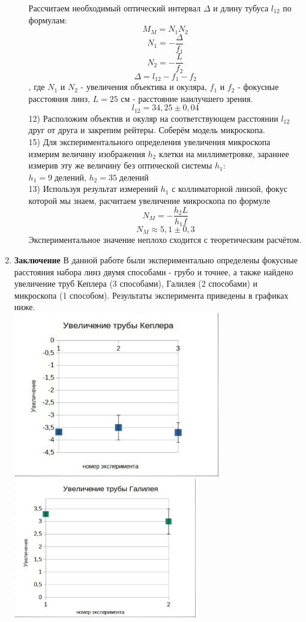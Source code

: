 \documentclass[a4paper]{article}
\begin{document}
\begin{multicols}{2}
\begin{enumerate}
\begin{enumerate}
Рассчитаем необходимый оптический интервал $\Delta$ и длину тубуса $l_{12}$ по формулам:
$$M_{M} = N_1N_2$$
$$N_1 = - \frac{\Delta}{f_1}$$
$$N_2 = - \frac{L}{f_2}$$
$$\Delta = l_{12} - f_1 - f_2$$
, где $N_1$ и $N_2$ - увеличения объектива и окуляра, $f_1$ и $f_2$ - фокусные расстояния линз, $L = 25$ см - расстояние наилучшего зрения.\\
$$l_{12} = 34,25 \pm 0,04$$
12) Расположим объектив и окуляр на соответствующем расстоянии $l_{12}$ друг от друга и закрепим рейтеры. Соберём модель микроскопа.\\
15) Для экспериментального определения увеличения микроскопа измерим величину изображения $h_2$ клетки на миллиметровке, зараннее измерив эту же величину без оптической системы $h_1$:\\
$h_1 = 9 \; \textit{делений}$, $h_2 = 35 \; \textit{делений}$\\
13) Используя результат измерений $h_1$ с коллиматорной линзой, фокус которой мы знаем, расчитаем увеличение микроскопа по формуле
$$N_{M} = - \frac{h_2L}{h_1f}$$
$$N_{M} \approx 5,1 \pm 0,3$$
Экспериментальное значение неплохо сходится с теоретическим расчётом.\\
 \end{enumerate}
 \item \textbf{Заключение}
 В данной работе были экспериментально определены фокусные расстояния набора линз двумя способами - грубо и точнее, а также найдено увеличение труб Кеплера (3 способами), Галилея (2 способами) и микроскопа (1 способом). Результаты эксперимента приведены в графиках ниже.\\
 \includegraphics[width = 9cm]{g1}\\
\includegraphics[width = 8cm]{g4}\\

\end{enumerate}
\end{multicols}
\end{document}
